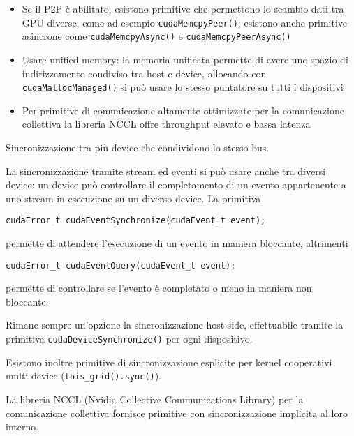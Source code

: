 \begin{questions}
\begin{solution}
\begin{itemize}
            \item Se il P2P è abilitato, esistono primitive che permettono lo scambio dati tra GPU diverse, come ad esempio \texttt{cudaMemcpyPeer()}; esistono anche primitive asincrone come \texttt{cudaMemcpyAsync()} e \texttt{cudaMemcpyPeerAsync()}
            
            \item Usare unified memory: la memoria unificata permette di avere uno spazio di indirizzamento condiviso tra host e device, allocando con \texttt{cudaMallocManaged()} si può usare lo stesso puntatore su tutti i dispositivi
            
            \item Per primitive di comunicazione altamente ottimizzate per la comunicazione collettiva la libreria NCCL offre throughput elevato e bassa latenza
        \end{itemize}
    \end{solution}
    
    \question Sincronizzazione tra più device che condividono lo stesso bus.
    
    \begin{solution}
        La sincronizzazione tramite stream ed eventi si può usare anche tra diversi device: un device può controllare il completamento di un evento appartenente a uno stream in esecuzione su un diverso device. La primitiva
        \begin{verbatim}
cudaError_t cudaEventSynchronize(cudaEvent_t event);
        \end{verbatim}
        permette di attendere l'esecuzione di un evento in maniera bloccante, altrimenti
        \begin{verbatim}
cudaError_t cudaEventQuery(cudaEvent_t event);
        \end{verbatim}
        permette di controllare se l'evento è completato o meno in maniera non bloccante.
        
        Rimane sempre un'opzione la sincronizzazione host-side, effettuabile tramite la primitiva \texttt{cudaDeviceSynchronize()} per ogni dispositivo.
        
        Esistono inoltre primitive di sincronizzazione esplicite per kernel cooperativi multi-device (\texttt{this\_grid().sync()}).
        
        La libreria NCCL (Nvidia Collective Communications Library) per la comunicazione collettiva fornisce primitive con sincronizzazione implicita al loro interno.
    \end{solution}
    

\end{questions}
